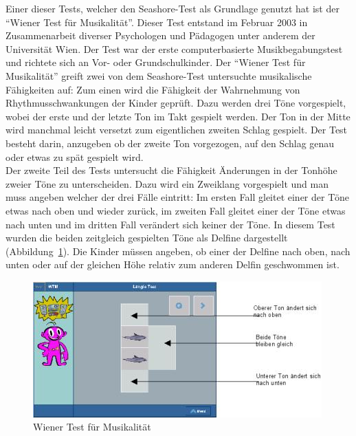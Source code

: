 \documentclass{acm_proc_article-sp}
\begin{document}
Einer dieser Tests, welcher den Seashore-Test als Grundlage genutzt hat ist der "`Wiener Test für Musikalität"'\cite{laengle:2003}. Dieser Test entstand im Februar 2003 in Zusammenarbeit diverser Psychologen und Pädagogen unter anderem der Universität Wien. Der Test war der erste computerbasierte Musikbegabungstest und richtete sich an Vor- oder Grundschulkinder. Der "`Wiener Test für Musikalität"' greift zwei von dem Seashore-Test untersuchte musikalische Fähigkeiten auf: Zum einen wird die Fähigkeit der Wahrnehmung von Rhythmusschwankungen der Kinder geprüft. Dazu werden drei Töne vorgespielt, wobei der erste und der letzte Ton im Takt gespielt werden. Der Ton in der Mitte wird manchmal leicht versetzt zum eigentlichen zweiten Schlag gespielt. Der Test besteht darin, anzugeben ob der zweite Ton vorgezogen, auf den Schlag genau oder etwas zu spät gespielt wird.\\
Der zweite Teil des Tests untersucht die Fähigkeit Änderungen in der Tonhöhe zweier Töne zu unterscheiden. Dazu wird ein Zweiklang vorgespielt und man muss angeben welcher der drei Fälle eintritt: Im ersten Fall gleitet einer der Töne etwas nach oben und wieder zurück, im zweiten Fall gleitet einer der Töne etwas nach unten und im dritten Fall verändert sich keiner der Töne. In diesem Test wurden die beiden zeitgleich gespielten Töne als Delfine dargestellt (Abbildung~\ref{pic:wienertest}). Die Kinder müssen angeben, ob einer der Delfine nach oben, nach unten oder auf der gleichen Höhe relativ zum anderen Delfin geschwommen ist. 
\begin{figure}[H]
\centering
\includegraphics[width=1.0\linewidth]{Abbildungen/wienertest.jpg}
\caption{Wiener Test für Musikalität}
\label{pic:wienertest}
\end{figure}
\end{document}
